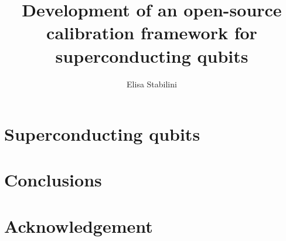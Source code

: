 \documentclass[twoside]{book}
\title{Development of an open-source calibration framework for superconducting qubits}
\author{Elisa Stabilini}
\date{}
\begin{document}
\frontmatter


\clearpage

\clearpage
\tableofcontents
\clearpage


\mainmatter

\chapter{Superconducting qubits}







\chapter{Conclusions}
%

\backmatter
\printbibliography


\chapter*{Acknowledgement}

\end{document}
